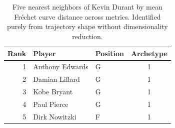 \begin{table}[htbp]
  \centering\small
  \begin{tabular}{rllc}
    \toprule
    Rank & Player & Position & Archetype \\
    \midrule
    1 & Anthony Edwards & G & 1 \\
    2 & Damian Lillard & G & 1 \\
    3 & Kobe Bryant & G & 1 \\
    4 & Paul Pierce & G & 1 \\
    5 & Dirk Nowitzki & F & 1 \\
    \bottomrule
  \end{tabular}
  \caption{Five nearest neighbors of Kevin Durant by mean Fr\'{e}chet curve distance across metrics. Identified purely from trajectory shape without dimensionality reduction.}
  \label{tab:Kevin_Durant_frechet_curve_neighbors}
\end{table}

